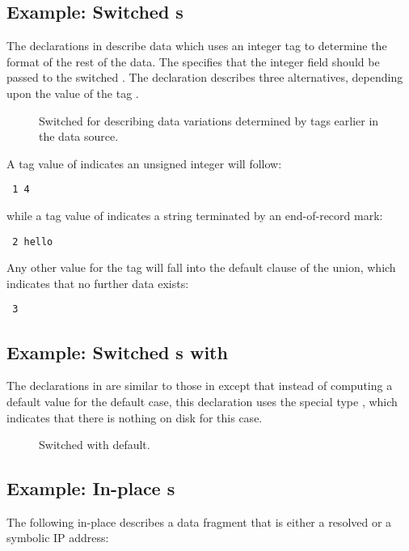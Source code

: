 \subsection{Example: Switched \Punion{}s}
The \pads{} declarations in  describe data
which uses an integer tag to determine the format of the rest of the
data. 
The \Pstruct{}  specifies that the integer field 
should be passed to the switched \Punion{} .   
The  declaration describes three alternatives, depending
upon the value of the tag .  
%
\begin{figure}
\caption{Switched \Punion{} for describing data variations determined
  by tags earlier in the data source.}
\label{fig:switched-union}
\end{figure}
%
A tag value of  indicates an unsigned integer will follow:
\begin{verbatim}
 1 4
\end{verbatim}
while a tag
value of  indicates a string terminated by an end-of-record
mark:  
\begin{verbatim}
 2 hello
\end{verbatim}
Any other value for the tag will fall into the default clause of the
union, which indicates that no further data
exists:
\begin{verbatim}
 3
\end{verbatim}

\subsection{Example: Switched \Punion{}s with \Pempty}
The \pads{} declarations in  
are similar to those in  except that
instead of computing a default value for the default case, this
declaration uses the special type \Pempty{}, which indicates that
there is nothing on disk for this case.  
%
\begin{figure}
\caption{Switched \Punion{} with \Pempty{} default.}
\label{fig:switched-union-default}
\end{figure}
%


\subsection{Example: In-place \Punion{}s}
The following in-place \Punion{} describes a data fragment that is
either a resolved or a symbolic IP address:


